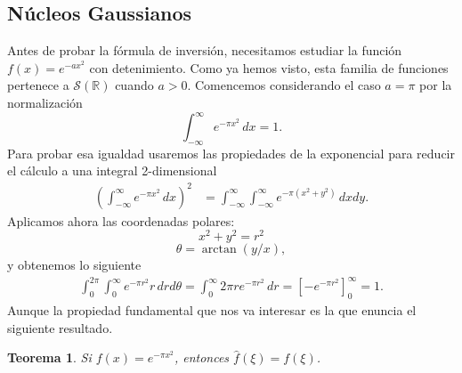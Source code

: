 \documentclass[12pt]{article}
\newcommand{\Sc}{\mathcal{S}(\mathbb{R})}
\theoremstyle{plain}
\newtheorem{teorema}{Teorema}[section] %
\theoremstyle{definition}
\numberwithin{equation}{section}
\begin{document}
        \subsection{Núcleos Gaussianos}
            Antes de probar la fórmula de inversión, necesitamos estudiar la función \(f(x) = e^{-ax^2}\) con detenimiento. Como ya hemos visto, esta familia de funciones pertenece a \(\Sc\) cuando \(a > 0\). Comencemos considerando el caso \(a = \pi\) por la normalización
            \begin{equation}
                \label{gauss} 
                \int_{-\infty}^{\infty} e^{-\pi x^2}\, dx = 1.
            \end{equation}
            Para probar esa igualdad usaremos las propiedades de la exponencial para reducir el cálculo a una integral 2-dimensional
            \begin{align*}
                \left(\int_{-\infty}^{\infty}  e^{-\pi x^2} \,dx \right)^2 &= \int_{-\infty}^{\infty} \int_{-\infty}^{\infty}  e^{-\pi (x^2+y^2)} \,dxdy.
            \end{align*}
            Aplicamos ahora las coordenadas polares: 
            $$ x^2+y^2=r^2 $$ 
            $$ \theta = \arctan(y/x), $$ 
            y obtenemos lo siguiente
            \begin{align*}
                \int_{0}^{2\pi} \int_{0}^{\infty}  e^{-\pi r^2} r \,drd\theta = \int_{0}^{\infty} 2\pi r e^{-\pi r^2} \,dr = \left[-e^{-\pi r^2}\right]_0^{\infty} = 1.
            \end{align*}
            Aunque la propiedad fundamental que nos va interesar es la que enuncia el siguiente resultado.
            \begin{teorema}
                \label{transgauss}
                Si \(f(x) = e^{-\pi x^2}\), entonces \(\hat{f}(\xi) = f(\xi)\).
            \end{teorema}
\end{document}
